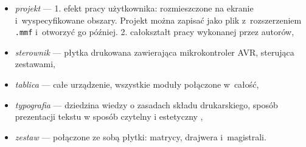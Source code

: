 \begin{itemize}
	\item \textit{projekt} --- 1. efekt pracy użytkownika: rozmieszczone na ekranie i~wyspecyfikowane obszary. Projekt można zapisać jako plik z~rozszerzeniem \texttt{.mmf} i~otworzyć go później. 2. całokształt pracy wykonanej przez autorów,

	\item \textit{sterownik} --- płytka drukowana zawierająca mikrokontroler AVR, sterująca zestawami,

	\item \textit{tablica} --- całe urządzenie, wszystkie moduły połączone w~całość,

	\item \textit{typografia} --- dziedzina wiedzy o zasadach składu drukarskiego, sposób prezentacji tekstu w sposób czytelny i estetyczny \cite{fonts},

	\item \textit{zestaw} --- połączone ze sobą płytki: matrycy, drajwera i~magistrali.
\end{itemize}
